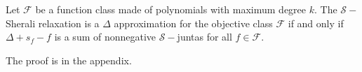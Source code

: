 


\begin{theorem}
Let $\mathcal{F}$ be a function class made of polynomials with maximum degree $k$. The $\mathcal{S}-$Sherali relaxation is a $\Delta$ approximation for the objective class $\mathcal{F}$ if and only if $\Delta + s_f - f$ is a sum of nonnegative $\mathcal{S}-$juntas for all $f \in \mathcal{F}$. 
\end{theorem}

The proof is in the appendix.




























